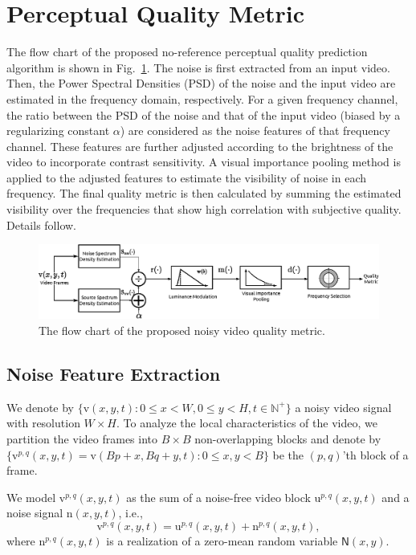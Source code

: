 \documentclass{sig-alternate}
\begin{document}
\section{Perceptual Quality Metric}
\label{sec:quality_metric}
The flow chart of the proposed no-reference perceptual quality prediction algorithm is shown in Fig.~\ref{fig:flow_chart}. The noise is first extracted from an input video. Then, the Power Spectral Densities (PSD) of the noise and the input video are estimated in the frequency domain, respectively. For a given frequency channel, the ratio between the PSD of the noise and that of the input video (biased by a regularizing constant $\alpha$) are considered as the noise features of that frequency channel. These features are further adjusted according to the brightness of the video to incorporate contrast sensitivity. A visual importance pooling method is applied to the adjusted features to estimate the visibility of noise in each frequency. The final quality metric is then calculated by summing the estimated visibility over the frequencies that show high correlation with subjective quality. Details follow. 
\begin{figure}
\includegraphics[width=\textwidth]{img/flow_chart.eps}
\caption{\label{fig:flow_chart}The flow chart of the proposed noisy video quality metric.}
\end{figure}

\subsection{Noise Feature Extraction}
We denote by $\{\mathrm{v}(x,y,t): 0\leq x< W, 0\leq y < H, t\in\mathbb{N}^+\}$ a noisy video signal with resolution $W\times H$. To analyze the local characteristics of the video, we partition the video frames into $B\times B$ non-overlapping blocks and denote by $\{\mathrm{v}^{p,q}(x,y,t)=\mathrm{v}(Bp+x,Bq+y,t): 0\leq x,y < B\}$ be the $(p,q)$'th block of a frame. 

We model $\mathrm{v}^{p,q}(x,y,t)$ as the sum of a noise-free video block $\mathrm{u}^{p,q}(x,y,t)$ and a noise signal $\mathrm{n}(x,y,t)$, i.e.,
\begin{equation}
\mathrm{v}^{p,q}(x,y,t) = \mathrm{u}^{p,q}(x,y,t) + \mathrm{n}^{p,q}(x,y,t),
\end{equation}
where $\mathrm{n}^{p,q}(x,y,t)$ is a realization of a zero-mean random variable $\mathsf{N}(x,y)$. 
\end{document}
